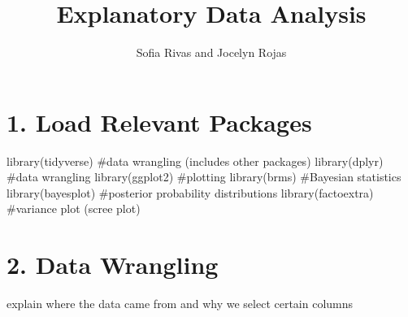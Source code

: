 \documentclass[
  letterpaper,
  DIV=11,
  numbers=noendperiod]{scrartcl}
\title{Explanatory Data Analysis}
\author{Sofia Rivas and Jocelyn Rojas}
\date{}
\newenvironment{Shaded}{\begin{snugshade}}{\end{snugshade}}
\newcommand{\CommentTok}[1]{\textcolor[rgb]{0.37,0.37,0.37}{#1}}
\newcommand{\FunctionTok}[1]{\textcolor[rgb]{0.28,0.35,0.67}{#1}}
\newcommand{\NormalTok}[1]{\textcolor[rgb]{0.00,0.23,0.31}{#1}}
\begin{document}
\maketitle


\section{1. Load Relevant Packages}\label{load-relevant-packages}

\begin{Shaded}
\begin{Highlighting}[]
\FunctionTok{library}\NormalTok{(tidyverse) }\CommentTok{\#data wrangling (includes other packages)}
\FunctionTok{library}\NormalTok{(dplyr) }\CommentTok{\#data wrangling }
\FunctionTok{library}\NormalTok{(ggplot2) }\CommentTok{\#plotting}
\FunctionTok{library}\NormalTok{(brms) }\CommentTok{\#Bayesian statistics }
\FunctionTok{library}\NormalTok{(bayesplot) }\CommentTok{\#posterior probability distributions }
\FunctionTok{library}\NormalTok{(factoextra) }\CommentTok{\#variance plot (scree plot)}
\end{Highlighting}
\end{Shaded}

\section{2. Data Wrangling}\label{data-wrangling}

explain where the data came from and why we select certain columns
\end{document}
